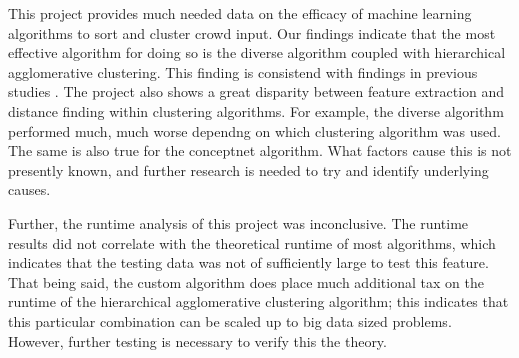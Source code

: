 This project provides much needed data on the efficacy of machine learning algorithms to sort and cluster crowd input.
Our findings indicate that the most effective algorithm for doing so is the diverse algorithm coupled with hierarchical agglomerative clustering.
This finding is consistend with findings in previous studies \cite{achananuparp2008evaluation}.
The project also shows a great disparity between feature extraction and distance finding within clustering algorithms.
For example, the diverse algorithm performed much, much worse dependng on which clustering algorithm was used. 
The same is also true for the conceptnet algorithm.
What factors cause this is not presently known, and further research is needed to try and identify underlying causes.

Further, the runtime analysis of this project was inconclusive.
The runtime results did not correlate with the theoretical runtime of most algorithms, which indicates that the testing data was not of sufficiently large to test this feature.
That being said, the custom algorithm does place much additional tax on the runtime of the hierarchical agglomerative clustering algorithm; this indicates that this particular combination can be scaled up to big data sized problems.
However, further testing is necessary to verify this the theory.